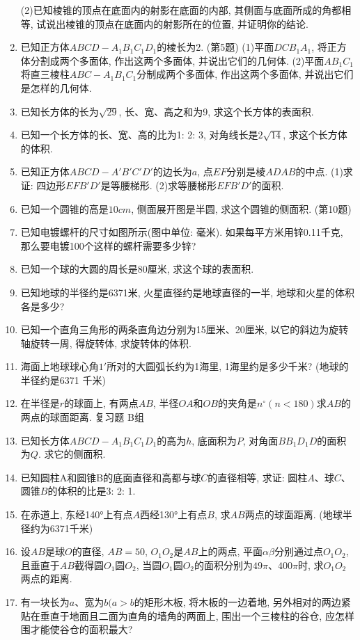 \documentclass[10pt,a4paper]{article}
\begin{document}
\begin{enumerate}[1.]
(2)已知棱锥的顶点在底面内的射影在底面的内部, 其侧面与底面所成的角都相等, 试说出棱锥的顶点在底面内的射影所在的位置, 并证明你的结论.
\item 已知正方体$ABCD-A_1B_1C_1D_1$的棱长为2.
(第5题)
(1)平面$DCB_1A_1$, 将正方体分割成两个多面体, 作出这两个多面体, 并说出它们的几何体.
(2)平面$AB_1C_1$将直三棱柱$ABC-A_1B_1C_1$分制成两个多面体, 作出这两个多面体, 并说出它们是怎样的几何体.
\item 已知长方体的长为$\sqrt {29}$, 长、宽、高之和为9, 求这个长方体的表面积.
\item 已知一个长方体的长、宽、高的比为1: 2: 3, 对角线长是$2\sqrt {14}$, 求这个长方体的体积.
\item 已知正方体$ABCD-A'B'C'D'$的边长为$a$, 点$EF$分别是棱$ADAB$的中点.
(1)求证: 四边形$EFB'D'$是等腰梯形.
(2)求等腰梯形$EFB'D'$的面积.
\item 已知一个圆锥的高是$10cm$, 侧面展开图是半圆, 求这个圆锥的侧面积.
(第10题)
\item 已知电镀螺杆的尺寸如图所示(图中单位: 毫米). 如果每平方米用锌0.11千克, 那么要电镀100个这样的螺杆需要多少锌?
\item 已知一个球的大圆的周长是80厘米, 求这个球的表面积.
\item 已知地球的半径约是6371米, 火星直径约是地球直径的一半, 地球和火星的体积各是多少?
\item 已知一个直角三角形的两条直角边分别为15厘米、20厘米, 以它的斜边为旋转轴旋转一周, 得旋转体, 求旋转体的体积.
\item 海面上地球球心角$1'$所对的大圆弧长约为1海里, 1海里约是多少千米? (地球的半径约是6371 千米)
\item 在半径是$r$的球面上, 有两点$AB$, 半径$OA$和$OB$的夹角是$n^\circ (n<180)$求$AB$的两点的球面距离.
复习题
B组
\item 已知长方体$ABCD-A_1B_1C_1D_1$的高为$h$, 底面积为$P$, 对角面$BB_1D_1D$的面积为$Q$.
求它的侧面积.
\item 已知圆柱A和圆锥B的底面直径和高都与球$C$的直径相等, 求证: 圆柱$A$、球$C$、圆锥$B$的体积的比是3: 2: 1.
\item 在赤道上, 东经140°上有点$A$西经130°上有点$B$, 求$AB$两点的球面距离. (地球半径约为6371千米)
\item 设$AB$是球$O$的直径, $AB=50$, $O_1O_2$是$AB$上的两点, 平面$\alpha \beta$分别通过点$O_1O_2$, 且垂直于$AB$截得圆$O_1$圆$O_2$, 当圆$O_1$圆$O_2$的面积分别为$49\pi$、$400\pi$时, 求$O_1O_2$两点的距离.
\item 有一块长为$a$、宽为$b(a>b$的矩形木板, 将木板的一边着地, 另外相对的两边紧贴在垂直于地面且二面为直角的墙角的两面上, 围出一个三棱柱的谷仓, 应怎样围才能使谷仓的面积最大?

\end{enumerate}
\end{document}
